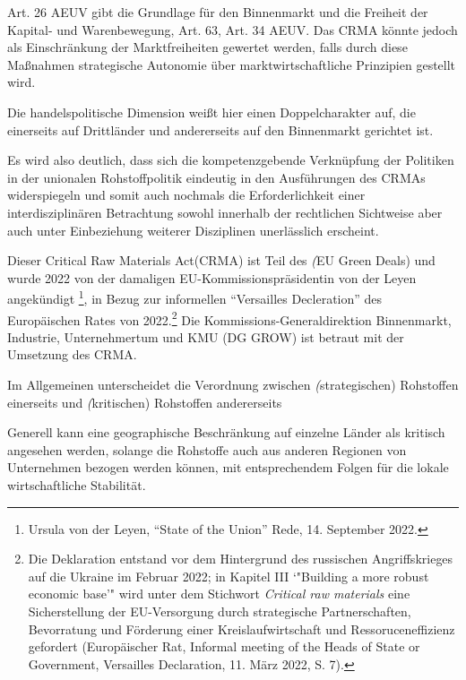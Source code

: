 \documentclass[12pt,a4paper,oneside]{book} %
\begin{document}
	 Art. 26 AEUV gibt die Grundlage für den Binnenmarkt und die Freiheit der Kapital- und Warenbewegung, Art. 63, Art. 34 AEUV. Das CRMA könnte jedoch als Einschränkung der Marktfreiheiten gewertet werden, falls durch diese Maßnahmen strategische Autonomie über marktwirtschaftliche Prinzipien gestellt wird.
	
	
	Die handelspolitische Dimension weißt hier einen Doppelcharakter auf, die einerseits auf Drittländer und andererseits auf den Binnenmarkt gerichtet ist.\autocite{Paschke, Rdtw 2024, 206, 211f}
	
	
	Es wird also deutlich, dass sich die kompetenzgebende Verknüpfung der Politiken in der unionalen Rohstoffpolitik eindeutig in den Ausführungen des CRMAs widerspiegeln und somit auch nochmals die Erforderlichkeit einer interdisziplinären Betrachtung sowohl innerhalb der rechtlichen Sichtweise aber auch unter Einbeziehung weiterer Disziplinen unerlässlich erscheint. 
	
	
	Dieser \glqq Critical Raw Materials Act\grqq (CRMA) ist Teil des \textit(EU Green Deals) und wurde 2022 von der damaligen EU-Kommissionspräsidentin von der Leyen angekündigt \footnote{Ursula von der Leyen, "`State of the Union"' Rede, 14. September 2022.}, in Bezug zur informellen "`Versailles Decleration"' des Europäischen Rates von 2022.\footnote{Die Deklaration entstand vor dem Hintergrund des russischen Angriffskrieges auf die Ukraine im Februar 2022; in Kapitel III `"Building a more robust economic base'" wird unter dem Stichwort \textit{Critical raw materials} eine Sicherstellung der EU-Versorgung durch strategische Partnerschaften, Bevorratung und Förderung einer Kreislaufwirtschaft und Ressoruceneffizienz gefordert (Europäischer Rat, Informal meeting of the Heads of State or Government, Versailles Declaration, 11. März 2022, S. 7).} Die Kommissions-Generaldirektion Binnenmarkt, Industrie, Unternehmertum und KMU (DG GROW) ist betraut mit der Umsetzung des CRMA.
	
	Im Allgemeinen unterscheidet die Verordnung zwischen \textit(strategischen) Rohstoffen einerseits und \textit(kritischen) Rohstoffen andererseits
	
	Generell kann eine geographische Beschränkung auf einzelne Länder als kritisch angesehen werden, solange die Rohstoffe auch aus anderen Regionen von Unternehmen bezogen werden können, mit entsprechendem Folgen für die lokale wirtschaftliche Stabilität.\autocite[s. hierzu]{ruettinger_doddfrank_2015}
	
\end{document}
